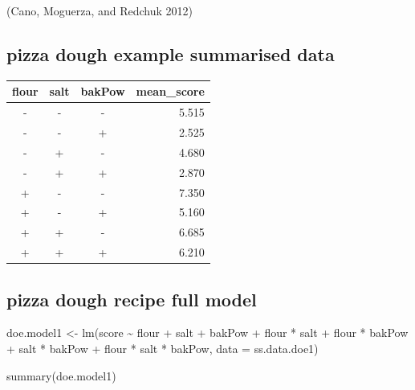 \documentclass[
  a4paper,
]{scrbook}
\newenvironment{Shaded}{\begin{snugshade}}{\end{snugshade}}
\newcommand{\AttributeTok}[1]{\textcolor[rgb]{0.40,0.45,0.13}{#1}}
\newcommand{\FunctionTok}[1]{\textcolor[rgb]{0.28,0.35,0.67}{#1}}
\newcommand{\NormalTok}[1]{\textcolor[rgb]{0.00,0.23,0.31}{#1}}
\newcommand{\OtherTok}[1]{\textcolor[rgb]{0.00,0.23,0.31}{#1}}
\newcommand{\SpecialCharTok}[1]{\textcolor[rgb]{0.37,0.37,0.37}{#1}}
\begin{document}
(Cano, Moguerza, and Redchuk 2012)

\subsection{pizza dough example summarised
data}\label{pizza-dough-example-summarised-data}

\begin{table}
\fontsize{12.0pt}{14.0pt}\selectfont
\begin{tabular*}{\linewidth}{@{\extracolsep{\fill}}cccr}
\toprule
flour & salt & bakPow & mean\_score \\ 
\midrule\addlinespace[2.5pt]
- & - & - & 5.515 \\ 
- & - & + & 2.525 \\ 
- & + & - & 4.680 \\ 
- & + & + & 2.870 \\ 
+ & - & - & 7.350 \\ 
+ & - & + & 5.160 \\ 
+ & + & - & 6.685 \\ 
+ & + & + & 6.210 \\ 
\bottomrule
\end{tabular*}
\end{table}

\subsection{pizza dough recipe full
model}\label{pizza-dough-recipe-full-model}

\begin{Shaded}
\begin{Highlighting}[]
\NormalTok{doe.model1 }\OtherTok{\textless{}{-}} \FunctionTok{lm}\NormalTok{(score }\SpecialCharTok{\textasciitilde{}}\NormalTok{ flour }\SpecialCharTok{+}\NormalTok{ salt }\SpecialCharTok{+}\NormalTok{ bakPow }\SpecialCharTok{+}
\NormalTok{flour }\SpecialCharTok{*}\NormalTok{ salt }\SpecialCharTok{+}\NormalTok{ flour }\SpecialCharTok{*}\NormalTok{ bakPow }\SpecialCharTok{+}
\NormalTok{salt }\SpecialCharTok{*}\NormalTok{ bakPow }\SpecialCharTok{+}\NormalTok{ flour }\SpecialCharTok{*}\NormalTok{ salt }\SpecialCharTok{*}\NormalTok{ bakPow,}
\AttributeTok{data =}\NormalTok{ ss.data.doe1)}

\FunctionTok{summary}\NormalTok{(doe.model1)}
\end{Highlighting}
\end{Shaded}
\end{document}
